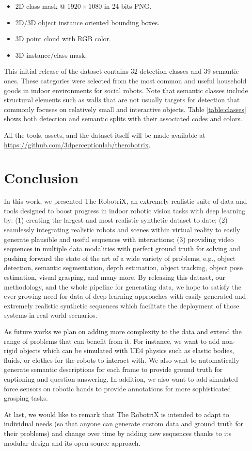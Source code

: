 \begin{itemize}
  \item 2D class mask @ $1920\times1080$ in 24-bits PNG.
  \item 2D/3D object instance oriented bounding boxes.
  \item 3D point cloud with RGB color.
  \item 3D instance/class mask.
\end{itemize}

This initial release of the dataset contains 32 detection classes and 39 semantic ones. These categories were selected from the most common and useful household goods in indoor environments for social robots. Note that semantic classes include structural elements such as walls that are not usually targets for detection that commonly focuses on relatively small and interactive objects. Table \ref{table:classes} shows both detection and semantic splits with their associated codes and colors.

All the tools, assets, and the dataset itself will be made available at \url{https://github.com/3dperceptionlab/therobotrix}.

\section{Conclusion}
\label{sec:conclusion}

In this work, we presented The RobotriX, an extremely realistic suite of data and tools designed to boost progress in indoor robotic vision tasks with deep learning by: (1) creating the largest and most realistic synthetic dataset to date; (2) seamlessly integrating realistic robots and scenes within virtual reality to easily generate plausible and useful sequences with interactions; (3) providing video sequences in multiple data modalities with perfect ground truth for solving and pushing forward the state of the art of a wide variety of problems, e.g., object detection, semantic segmentation, depth estimation, object tracking, object pose estimation, visual grasping, and many more. By releasing this dataset, our methodology, and the whole pipeline for generating data, we hope to satisfy the ever-growing need for data of deep learning approaches with easily generated and extremely realistic synthetic sequences which facilitate the deployment of those systems in real-world scenarios. 

As future works we plan on adding more complexity to the data and extend the range of problems that can benefit from it. For instance, we want to add non-rigid objects which can be simulated with \acl{UE4} physics such as elastic bodies, fluids, or clothes for the robots to interact with. We also want to automatically generate semantic descriptions for each frame to provide ground truth for captioning and question answering. In addition, we also want to add simulated force sensors on robotic hands to provide annotations for more sophisticated grasping tasks.

At last, we would like to remark that The RobotriX is intended to adapt to individual needs (so that anyone can generate custom data and ground truth for their problems) and change over time by adding new sequences thanks to its modular design and its open-source approach.